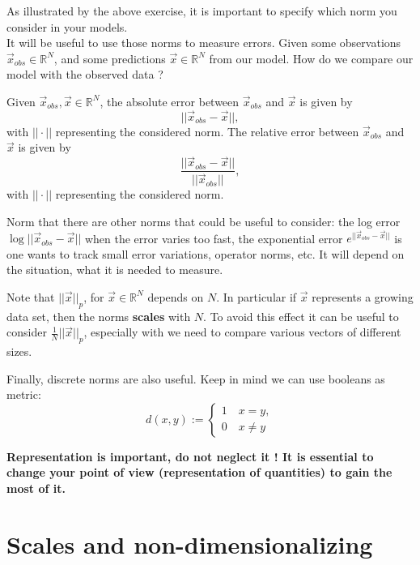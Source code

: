 As illustrated by the above exercise, it is important to specify which norm you consider in your models.\\

It will be useful to use those norms to measure errors. Given some observations $\vec{x}_{obs} \in \mathbb{R}^N$, and some predictions $\vec{x} \in \mathbb{R}^N$ from our model. How do we compare our model with the observed data ?

\begin{definition}
Given $\vec{x}_{obs}, \vec{x} \in \mathbb{R}^N$, the absolute error between $\vec{x}_{obs} $ and $\vec{x}$ is given by 
\[||\vec{x}_{obs}  - \vec{x} ||, \]with $|| \cdot ||$ representing the considered norm. The relative error between $\vec{x}_{obs} $ and $\vec{x}$ is given by 
\[ \displaystyle \frac{||\vec{x}_{obs}  - \vec{x} ||}{||\vec{x}_{obs}|| }, \]with $|| \cdot ||$ representing the considered norm.
\end{definition}

Norm that there are other norms that could be useful to consider: the log error $\log ||\vec{x}_{obs}  - \vec{x} ||$ when the error varies too fast, the exponential error $e^{||\vec{x}_{obs}  - \vec{x} ||}$ is one wants to track small error variations, operator norms, etc. It will depend on the situation, what it is needed to measure. \\

\begin{remark}
Note that $|| \vec{x} ||_p$, for $\vec{x} \in \mathbb{R}^N$ depends on $N$. In particular if $\vec{x}$ represents a growing data set, then the norms \textbf{scales} with $N$. To avoid this effect it can be useful to consider  $\frac{1}{N}|| \vec{x} ||_p$, especially with we need to compare various vectors of different sizes.
\end{remark}

Finally, discrete norms are also useful. Keep in mind we can use booleans as metric:
\[ d(x,y) := \begin{cases} 1 \quad x = y, \\
0 \quad x \neq y
\end{cases}\]

\textbf{Representation is important, do not neglect it ! It is essential to change your point of view (representation of quantities) to gain the most of it.}
\section{Scales and non-dimensionalizing}

